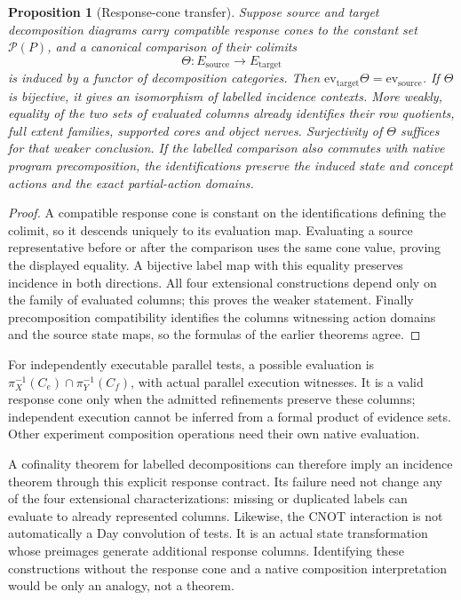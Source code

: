 \documentclass[11pt]{article}
\newtheorem{proposition}[theorem]{Proposition}
\theoremstyle{remark}\newtheorem{remark}[theorem]{Remark}
\newcommand{\Pow}{\mathcal P}
\begin{document}
\begin{proposition}[Response-cone transfer]
Suppose source and target decomposition diagrams carry compatible
response cones to the constant set $\Pow(P)$, and a canonical
comparison of their colimits
\[
 \Theta:E_{\mathrm{source}}\longrightarrow E_{\mathrm{target}}
\]
is induced by a functor of decomposition categories. Then
$\mathrm{ev}_{\mathrm{target}}\Theta
=\mathrm{ev}_{\mathrm{source}}$.
If $\Theta$ is bijective, it gives an isomorphism of labelled incidence
contexts. More weakly, equality of the two sets of evaluated columns
already identifies their row quotients, full extent families, supported
cores and object nerves. Surjectivity of $\Theta$ suffices for that
weaker conclusion. If the labelled comparison also commutes with
native program precomposition, the identifications preserve the
induced state and concept actions and the exact partial-action domains.
\end{proposition}
\begin{proof}
A compatible response cone is constant on the identifications defining
the colimit, so it descends uniquely to its evaluation map. Evaluating
a source representative before or after the comparison uses the same
cone value, proving the displayed equality. A bijective label map with
this equality preserves incidence in both directions. All four
extensional constructions depend only on the family of evaluated
columns; this proves the weaker statement. Finally precomposition
compatibility identifies the columns witnessing action domains and the
source state maps, so the formulas of the earlier theorems agree.
\end{proof}
For independently executable parallel tests, a possible evaluation is
$\pi_X^{-1}(C_e)\cap\pi_Y^{-1}(C_f)$, with actual parallel execution
witnesses. It is a valid response cone only when the admitted
refinements preserve these columns; independent execution cannot be
inferred from a formal product of evidence sets. Other experiment
composition operations need their own native evaluation.

A cofinality theorem for labelled decompositions can therefore imply
an incidence theorem through this explicit response contract. Its
failure need not change any of the four extensional characterizations:
missing or duplicated labels can evaluate to already represented
columns. Likewise, the CNOT interaction is not automatically a Day
convolution of tests. It is an actual state transformation whose
preimages generate additional response columns. Identifying these
constructions without the response cone and a native composition
interpretation would be only an analogy, not a theorem.
\end{document}
